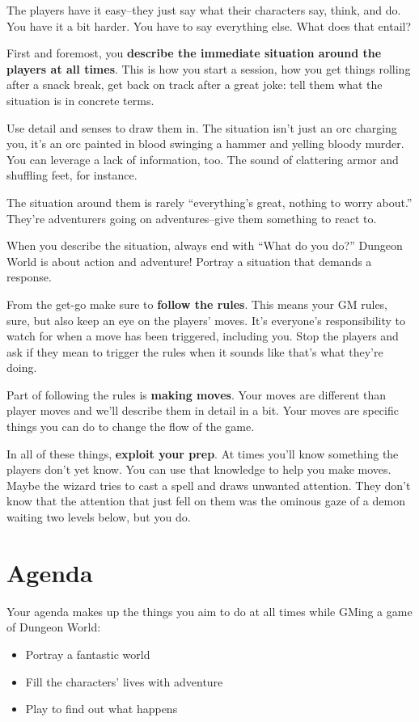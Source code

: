  The players have it easy--they just say what their characters say, think, and do. You have it a bit harder. You have to say everything else. What does that entail?


 First and foremost, you \textbf{describe the immediate situation around the players at all times}. This is how you start a session, how you get things rolling after a snack break, get back on track after a great joke: tell them what the situation is in concrete terms.


 Use detail and senses to draw them in. The situation isn't just an orc charging you, it's an orc painted in blood swinging a hammer and yelling bloody murder. You can leverage a lack of information, too. The sound of clattering armor and shuffling feet, for instance.


 The situation around them is rarely ``everything's great, nothing to worry about.'' They're adventurers going on adventures--give them something to react to.


 When you describe the situation, always end with ``What do you do?'' Dungeon World is about action and adventure! Portray a situation that demands a response.


 From the get-go make sure to \textbf{follow the rules}. This means your GM rules, sure, but also keep an eye on the players' moves. It's everyone's responsibility to watch for when a move has been triggered, including you. Stop the players and ask if they mean to trigger the rules when it sounds like that's what they're doing.


 Part of following the rules is \textbf{making moves}. Your moves are different than player moves and we'll describe them in detail in a bit. Your moves are specific things you can do to change the flow of the game.


 In all of these things, \textbf{exploit your prep}. At times you'll know something the players don't yet know. You can use that knowledge to help you make moves. Maybe the wizard tries to cast a spell and draws unwanted attention. They don't know that the attention that just fell on them was the ominous gaze of a demon waiting two levels below, but you do. 
\section*{Agenda}


 Your agenda makes up the things you aim to do at all times while GMing a game of Dungeon World:
\begin{itemize}
\item Portray a fantastic world
\item Fill the characters' lives with adventure
\item Play to find out what happens

\end{itemize}


